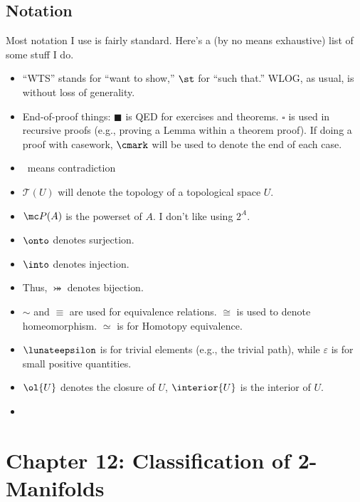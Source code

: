 \documentclass{fkbook}
\renewcommand{\epsilon}{\lunateepsilon}
\begin{document}
\section*{Notation}
Most notation I use is fairly standard. Here's a (by no means exhaustive) list
of some stuff I do.
\begin{itemize}
  \item ``WTS'' stands for ``want to show,'' $\st$ for ``such that.'' WLOG, as
    usual, is without loss of generality.
  \item End-of-proof things: $\blacksquare$ is QED for exercises and theorems.
    $\square$ is used in recursive proofs (e.g., proving a Lemma within a
    theorem proof). If doing a proof with casework, $\cmark$ will be used to
    denote the end of each case.
  \item \contra\ means contradiction
  \item $\mathscr{T}(U)$ will denote the topology of a topological space $U$.
  \item $\mc P(A)$ is the powerset of $A$. I don't like using $2^A$.
  \item $\onto$ denotes surjection.
  \item $\into$ denotes injection.
  \item Thus, $\bij$ denotes bijection.
  \item $\sim$ and $\equiv$ are used for equivalence relations. $\cong$ is used
    to denote homeomorphism. $\simeq$ is for Homotopy equivalence.
  \item $\epsilon$ is for trivial elements (e.g., the trivial path), while
    $\varepsilon$ is for small positive quantities.
  \item $\ol{U}$ denotes the closure of $U$, $\interior{U}$ is the interior of
    $U$.
  \item
\end{itemize}

\mainmatter
\pagestyle{main}
\chapter{Chapter 12: Classification of 2-Manifolds}
\end{document}
